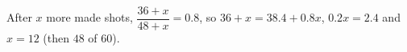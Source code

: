 After $x$ more made shots, $\dfrac{36+x}{48+x}=0.8$, so $36+x=38.4+0.8x$, $0.2x=2.4$ and $x=\boxed{12}$ (then $48$ of $60$).
